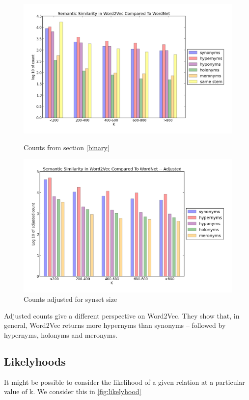 \documentclass{article}
\begin{document}
\begin{figure}[!ht]
  \begin{minipage}{0.7\textwidth}
    \includegraphics[width=\textwidth]{all.png}
    \caption{Counts from section \ref{binary}}
  \end{minipage}
 
  \begin{minipage}{0.7\textwidth}
    \includegraphics[width=\textwidth]{Adjusted.png}
    \caption{Counts adjusted for synset size}
  \end{minipage}
\end{figure}

Adjusted counts give a different perspective on Word2Vec. They show that, in general, Word2Vec returns more hypernyms than synonyms -- followed by hypernyms, holonyms and meronyms. 

\subsection{Likelyhoods}
It might be possible to consider the likelihood of a given relation at a particular value of k. We consider this in \ref{fig:likelyhood}
\end{document}
